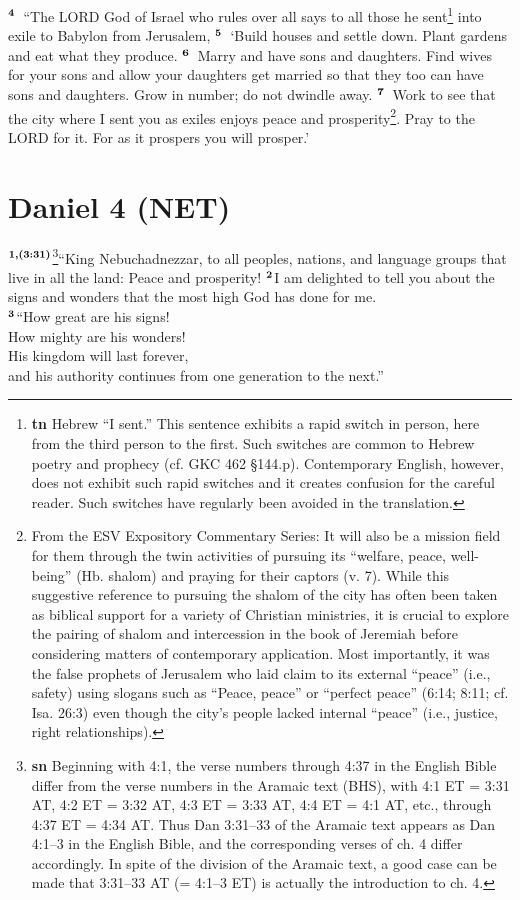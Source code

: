 \documentclass[12pt,a4paper,final]{article}
\renewcommand{\textsuperscript}[1]{\ensuremath{^{\textbf{\scriptsize #1}}}}
\begin{document}
\textsuperscript{4} “The LORD God of Israel who rules over all says to all those he sent\footnote{\textbf{tn} Hebrew “I sent.” This sentence exhibits a rapid switch in person, here from the third person to the first. Such switches are common to Hebrew poetry and prophecy (cf. GKC 462 §144.p). Contemporary English, however, does not exhibit such rapid switches and it creates confusion for the careful reader. Such switches have regularly been avoided in the translation.} into exile to Babylon from Jerusalem, \textsuperscript{5} ‘Build houses and settle down. Plant gardens and eat what they produce. \textsuperscript{6} Marry and have sons and daughters. Find wives for your sons and allow your daughters get married so that they too can have sons and daughters. Grow in number; do not dwindle away. \textsuperscript{7} Work to see that the city where I sent you as exiles enjoys peace and prosperity\footnote{From the ESV Expository Commentary Series: It will also be a mission field for them through the twin activities of pursuing its “welfare, peace, well-being” (Hb. shalom) and praying for their captors (v. 7). While this suggestive reference to pursuing the shalom of the city has often been taken as biblical support for a variety of Christian ministries, it is crucial to explore the pairing of shalom and intercession in the book of Jeremiah before considering matters of contemporary application. Most importantly, it was the false prophets of Jerusalem who laid claim to its external “peace” (i.e., safety) using slogans such as “Peace, peace” or “perfect peace” (6:14; 8:11; cf. Isa. 26:3) even though the city’s people lacked internal “peace” (i.e., justice, right relationships).}. Pray to the LORD for it. For as it prospers you will prosper.’ 


\section*{Daniel 4 (NET)}

\textsuperscript{1,(3:31)}\footnote{\textbf{sn} Beginning with 4:1, the verse numbers through 4:37 in the English Bible differ from the verse numbers in the Aramaic text (BHS), with 4:1 ET = 3:31 AT, 4:2 ET = 3:32 AT, 4:3 ET = 3:33 AT, 4:4 ET = 4:1 AT, etc., through 4:37 ET = 4:34 AT. Thus Dan 3:31–33 of the Aramaic text appears as Dan 4:1–3 in the English Bible, and the corresponding verses of ch. 4 differ accordingly. In spite of the division of the Aramaic text, a good case can be made that 3:31–33 AT (= 4:1–3 ET) is actually the introduction to ch. 4.}“King Nebuchadnezzar, to all peoples, nations, and language groups that live in all the land: Peace and prosperity! \textsuperscript{2}I am delighted to tell you about the signs and wonders that the most high God has done for me.\\ 
    \textsuperscript{3}“How great are his signs! \\
    How mighty are his wonders! \\
    His kingdom will last forever, \\ 
    and his authority continues from one generation to the next.” 
\end{document}
